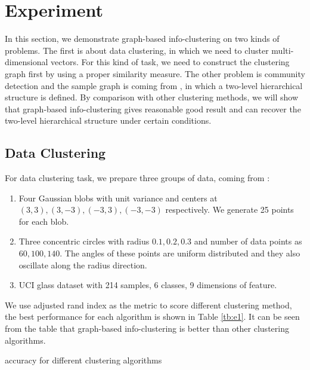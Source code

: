 \documentclass{article}
\begin{document}
\section{Experiment}\label{sec:experiment}
In this section, we demonstrate graph-based info-clustering on two kinds of problems. The first is about data clustering, in which we need to cluster multi-dimensional vectors. For this kind of task, we need to construct the clustering graph first by using a proper similarity measure. The other problem is community detection and the sample graph is coming from \cite{RN22}, in which a two-level hierarchical structure is defined. By comparison with other clustering methods, we will show that graph-based info-clustering gives reasonable good result and can recover the two-level hierarchical structure under certain conditions. 

\subsection{Data Clustering}\label{sec:fc}
For data clustering task, we prepare three groups of data, coming from \cite{RN7}:
\begin{enumerate}
\item Four Gaussian blobs with unit variance and centers at $(3,3), (3,-3), (-3,3), (-3,-3)$ respectively.  We generate 25 points for each blob.
\item Three concentric circles with radius $0.1,0.2,0.3$ and number of data points as $60, 100, 140$. The angles of these points are uniform distributed and they also oscillate along the radius direction.
\item UCI glass dataset with 214 samples, 6 classes, 9 dimensions of feature.
\end{enumerate}
We use adjusted rand index as the metric to score different clustering method, the best performance for each algorithm is shown in Table \ref{tb:e1}.  It can be seen from the table that graph-based info-clustering is better than other clustering algorithms.
\begin{table}[!ht]
\centering
{}
\caption{ accuracy for different clustering algorithms }\label{tb:e1}
\end{table}
\end{document}
